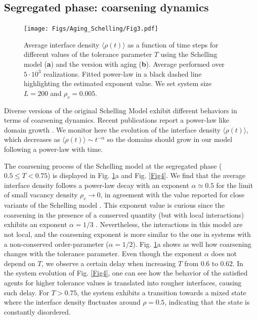 \subsection{Segregated phase: coarsening dynamics}

\begin{figure}
\centering \captionsetup{font=sf}
\texttt{[image: Figs/Aging\_Schelling/Fig3.pdf]} 
\caption[Average interface density evolution]{Average interface density $\langle \rho (t) \rangle$ as a function of time steps for different values of the tolerance parameter $T$ using the Schelling model (\textbf{a}) and the version with aging (\textbf{b}). Average performed over $5 \cdot 10^3$ realizations. Fitted power-law in a black dashed line highlighting the estimated exponent value. We set system size $L = 200$ and $\rho_v = 0.005$.}
\label{Fig3}
\end{figure}

Diverse versions of the original Schelling Model exhibit different behaviors in terms of coarsening dynamics. Recent publications report a power-law like domain growth \cite{Dall_Asta_2008,Interfacial_roughening}. We monitor here the evolution of the interface density $\langle \rho (t) \rangle$, which decreases as $ \langle \rho (t) \rangle \sim t^{-\alpha}$ so the domains should grow in our model following a power-law with time. 

The coarsening process of the Schelling model at the segregated phase ($0.5 \le T < 0.75$) is displayed in Fig. \ref{Fig3}a and Fig. \ref{Fig4}. We find that the average interface density follows a power-law decay with an exponent $\alpha \simeq 0.5$ for the limit of small vacancy density $\rho_v \to 0$, in agreement with the value reported for close variants of the Schelling model \cite{Dall_Asta_2008}. This exponent value is curious since the coarsening in the presence of a conserved quantity (but with local interactions) exhibits an exponent $\alpha = 1/3$ \cite{Maxi}. Nevertheless, the interactions in this model are not local, and the coarsening exponent is more similar to the one in systems with a non-conserved order-parameter ($\alpha = 1/2$). Fig. \ref{Fig3}a shows as well how coarsening changes with the tolerance parameter. Even though the exponent $\alpha$ does not depend on $T$, we observe a certain delay when increasing $T$ from $0.6$ to $0.62$. In the system evolution of Fig. \ref{Fig4}, one can see how the behavior of the satisfied agents for higher tolerance values is translated into rougher interfaces, causing such delay. For $T > 0.75$, the system exhibits a transition towards a mixed state where the interface density fluctuates around $\rho = 0.5$, indicating that the state is constantly disordered.


